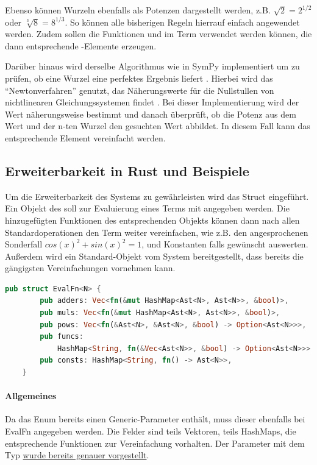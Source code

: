 \documentclass[11pt,a4paper, ngerman]{article}
\begin{document}
Ebenso können Wurzeln ebenfalls als Potenzen dargestellt werden, z.B. $\sqrt{2} = 2^{1/2}$ oder $\sqrt[3]{8} = 8^{1/3}$. So können alle bisherigen Regeln hierrauf einfach angewendet werden. Zudem sollen die Funktionen  und  im Term verwendet werden können, die dann entsprechende -Elemente erzeugen.

Darüber hinaus wird derselbe Algorithmus wie in SymPy implementiert um zu prüfen, ob eine Wurzel eine perfektes Ergebnis liefert \cite{SymPyNewton}. Hierbei wird das ``Newtonverfahren'' genutzt, das Näherungswerte für die Nullstullen von nichtlinearen Gleichungssystemen findet \cite{NewtonDetail}. Bei dieser Implementierung wird der Wert näherungsweise bestimmt und danach überprüft, ob die Potenz aus dem Wert und der n-ten Wurzel den gesuchten Wert abbildet. In diesem Fall kann das entsprechende Element vereinfacht werden.

\label{sec:kapErRustUndBei}
\subsection{Erweiterbarkeit in Rust und Beispiele}
Um die Erweiterbarkeit des Systems zu gewährleisten wird das Struct  eingeführt. Ein Objekt des  soll zur Evaluierung eines Terms mit angegeben werden. Die hinzugefügten Funktionen des entsprechenden Objekts können dann nach allen Standardoperationen den Term weiter vereinfachen, wie z.B. den angesprochenen Sonderfall $cos(x)^2+sin(x)^2 = 1$, und Konstanten falls gewünscht auswerten. Außerdem wird ein Standard-Objekt vom System bereitgestellt, dass bereits die gängigsten Vereinfachungen vornehmen kann.

\begin{lstlisting}[language=rust, caption={Defintion EvalFn}]
    pub struct EvalFn<N> {
        pub adders: Vec<fn(&mut HashMap<Ast<N>, Ast<N>>, &bool)>,
        pub muls: Vec<fn(&mut HashMap<Ast<N>, Ast<N>>, &bool)>,
        pub pows: Vec<fn(&Ast<N>, &Ast<N>, &bool) -> Option<Ast<N>>>,
        pub funcs: 
            HashMap<String, fn(&Vec<Ast<N>>, &bool) -> Option<Ast<N>>>,
        pub consts: HashMap<String, fn() -> Ast<N>>,
    }
\end{lstlisting}

\paragraph{Allgemeines} Da das Enum  bereits einen Generic-Parameter enthält, muss dieser ebenfalls bei EvalFn angegeben werden. Die Felder sind teils Vektoren, teils HashMaps, die entsprechende Funktionen zur Vereinfachung vorhalten. Der Parameter mit dem Typ  \hyperref[sec:kapAddnundMult]{wurde bereits genauer vorgestellt}.
\end{document}
